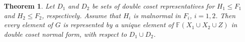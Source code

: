 \documentclass[a4paper,12pt]{article}
\newtheorem{theorem}{Theorem}[section]
\numberwithin{equation}{section}
\numberwithin{figure}{section}
\newcommand{\FF}{\ensuremath{\mathbb{F}}}
\begin{document}

\begin{theorem}\label{thm:dcnf} Let $D_1$ and $D_2$ be sets of  double coset representatives for
$H_1\le F_1$ and $H_2\le F_2$, respectively. Assume that
$H_i$ is malnormal in $F_i$, $i=1,2$. 
Then every element of $G$ is represented by a unique element of
$\FF(X_1\cup X_2\cup Z)$ in double coset normal form, with respect
to $D_1\cup D_2$.
\end{theorem}
\end{document}
